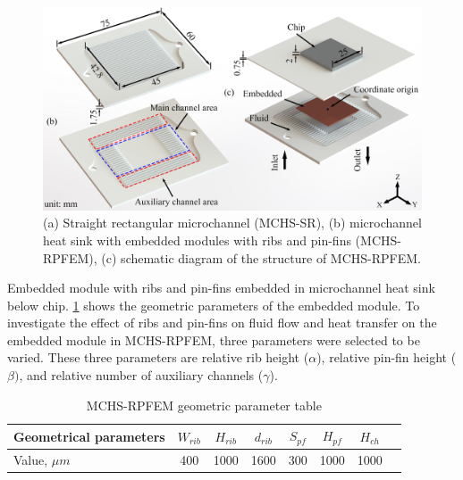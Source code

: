 \begin{figure}[htbp] %
    \centering %
    \scriptsize %
    \includegraphics[width=1 \textwidth]{Schematic.jpg} %
    \caption{
        (a) Straight rectangular microchannel (MCHS-SR),
        (b) microchannel heat sink with embedded modules with ribs and pin-fins (MCHS-RPFEM),
        (c) schematic diagram of the structure of MCHS-RPFEM.}
    \label{fig:structure}
\end{figure}
Embedded module with ribs and pin-fins embedded in microchannel heat sink below chip.
\cref{tab:structure-parameter} shows the geometric parameters of the embedded module.
To investigate the effect of ribs and pin-fins on fluid flow and heat transfer on the embedded module in MCHS-RPFEM, three parameters were selected to be varied.
These three parameters are relative rib height ($\alpha$), relative pin-fin height ($\beta)$, and relative number of auxiliary channels ($\gamma$).

\begin{table}[htbp]
    \centering
    \scriptsize
    \caption{MCHS-RPFEM geometric parameter table}
    \begin{tabular}{lccccccc}
        \toprule
        Geometrical parameters & $W_{rib}$ & $H_{rib}$ & $d_{rib}$ & $S_{pf}$ & $H_{pf}$ & $H_{ch}$ \\
        \midrule
        Value, $\mu m$         & 400       & 1000      & 1600      & 300      & 1000     & 1000     \\
        \bottomrule
    \end{tabular}
    \label{tab:structure-parameter}
\end{table}